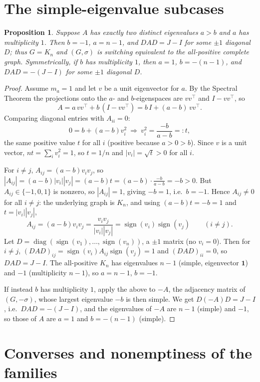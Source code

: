 \documentclass{amsart}
\newtheorem{proposition}{Proposition}
\theoremstyle{definition}
\begin{document}
\section{The simple-eigenvalue subcases}\label{sec:simple}

\begin{proposition}\label{prop:simple}
Suppose $A$ has exactly two distinct eigenvalues $a>b$ and $a$ has
multiplicity $1$. Then $b=-1$, $a=n-1$, and $DAD=J-I$ for some $\pm1$ diagonal
$D$; thus $G=K_n$ and $(G,\sigma)$ is switching equivalent to the all-positive
complete graph. Symmetrically, if $b$ has multiplicity $1$, then $a=1$,
$b=-(n-1)$, and $DAD=-(J-I)$ for some $\pm1$ diagonal $D$.
\end{proposition}

\begin{proof}
Assume $m_a=1$ and let $v$ be a unit eigenvector for $a$. By the Spectral
Theorem the projections onto the $a$- and $b$-eigenspaces are $vv^\top$ and
$I-vv^\top$, so
\[
A=a\,vv^\top+b\,(I-vv^\top)=b\,I+(a-b)\,vv^\top .
\]
Comparing diagonal entries with $A_{ii}=0$:
\[
0=b+(a-b)v_i^2\ \Longrightarrow\ v_i^2=\frac{-b}{a-b}=:t,
\]
the same positive value $t$ for all $i$ (positive because $a>0>b$). Since $v$
is a unit vector, $nt=\sum_i v_i^2=1$, so $t=1/n$ and $|v_i|=\sqrt t>0$ for all
$i$.

For $i\ne j$, $A_{ij}=(a-b)v_iv_j$, so
$|A_{ij}|=(a-b)|v_i||v_j|=(a-b)t=(a-b)\cdot\frac{-b}{a-b}=-b>0$. But
$A_{ij}\in\{-1,0,1\}$ is nonzero, so $|A_{ij}|=1$, giving $-b=1$, i.e.\ $b=-1$.
Hence $A_{ij}\ne0$ for all $i\ne j$: the underlying graph is $K_n$, and using
$(a-b)t=-b=1$ and $t=|v_i||v_j|$,
\[
A_{ij}=(a-b)v_iv_j=\frac{v_iv_j}{|v_i||v_j|}
=\operatorname{sign}(v_i)\operatorname{sign}(v_j)\qquad(i\ne j).
\]
Let $D=\operatorname{diag}(\operatorname{sign}(v_1),\dots,
\operatorname{sign}(v_n))$, a $\pm1$ matrix (no $v_i=0$). Then for $i\ne j$,
$(DAD)_{ij}=\operatorname{sign}(v_i)A_{ij}\operatorname{sign}(v_j)=1$ and
$(DAD)_{ii}=0$, so $DAD=J-I$. The all-positive $K_n$ has eigenvalues $n-1$
(simple, eigenvector $\mathbf 1$) and $-1$ (multiplicity $n-1$), so $a=n-1$,
$b=-1$.

If instead $b$ has multiplicity $1$, apply the above to $-A$, the adjacency
matrix of $(G,-\sigma)$, whose largest eigenvalue $-b$ is then simple. We get
$D(-A)D=J-I$, i.e.\ $DAD=-(J-I)$, and the eigenvalues of $-A$ are $n-1$
(simple) and $-1$, so those of $A$ are $a=1$ and $b=-(n-1)$ (simple).
\end{proof}

\section{Converses and nonemptiness of the families}\label{sec:examples}
\end{document}
